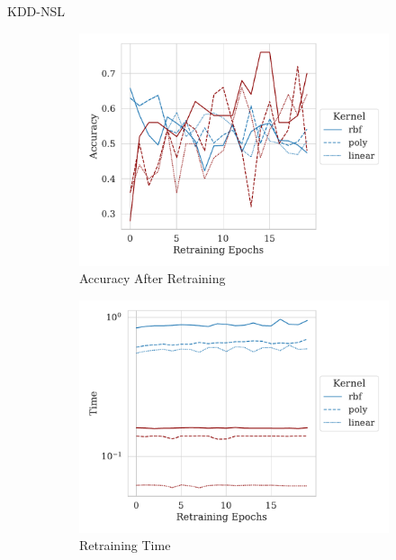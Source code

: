\documentclass{beamer}
\begin{document}
\begin{frame}{KDD-NSL}
    \begin{figure}
     \centering
     \begin{subfigure}{0.4\textwidth}
         \centering
         \includegraphics[width=\textwidth]{./kdd-nsl/retrain_accuracy.pdf}
         \caption{Accuracy After Retraining}
     \end{subfigure}
     \hfill
     \begin{subfigure}{0.4\textwidth}
         \centering
         \includegraphics[width=\textwidth]{./kdd-nsl/retrain_time.pdf}
         \caption{Retraining Time}
     \end{subfigure}
     \hfill
     \begin{subfigure}{0.4\textwidth}

\end{subfigure}
\end{figure}
\end{frame}
\end{document}
